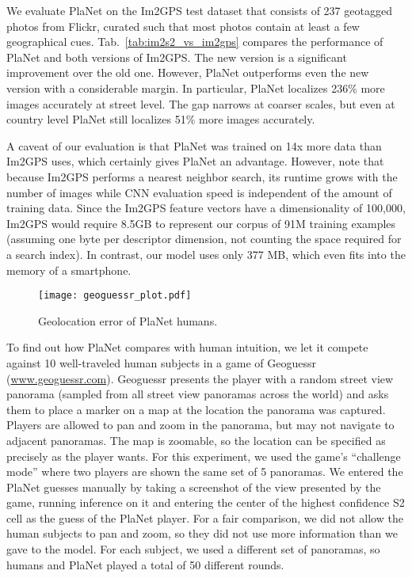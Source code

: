 \documentclass[10pt,twocolumn,letterpaper]{article}
\begin{document}
We evaluate PlaNet on the Im2GPS test dataset \cite{Hays08CVPR}
that consists of 237 geotagged photos from Flickr, curated such that
most photos contain at least a few geographical cues. 
Tab.~\ref{tab:im2s2_vs_im2gps} compares the performance of
PlaNet and both versions of Im2GPS. The new version is a
significant improvement over the old one. However, PlaNet
outperforms even the new version with a considerable margin. In
particular, PlaNet localizes 236\% more images accurately at
street level. The gap narrows at coarser scales, but even at country level
PlaNet still localizes 51\% more images accurately.

A caveat of our evaluation is that PlaNet was trained on 14x
more data than Im2GPS uses, which certainly gives PlaNet an
advantage. However, note that because Im2GPS performs a nearest
neighbor search, its runtime grows with the number of images while CNN
evaluation speed is independent of the amount of training data. Since
the Im2GPS feature vectors have a dimensionality of 100,000, Im2GPS
would require 8.5GB to represent our corpus of 91M training examples
(assuming one byte per descriptor dimension, not counting the space
required for a search index). In contrast, our model uses only 377 MB,
which even fits into the memory of a smartphone.

\begin{figure}
  \texttt{[image: geoguessr\_plot.pdf]}
  \caption{Geolocation error of PlaNet \vs humans.}
  \label{fig:geoguessr_plot}
\end{figure}
To find out how PlaNet compares with human intuition, we let it compete against 10
well-traveled human subjects in a game of Geoguessr
(\href{http://www.geoguessr.com}{www.geoguessr.com}). Geoguessr
presents the player with a random street view panorama (sampled from
all street view panoramas across the world) and asks them to place a
marker on a map at the location the panorama was captured. Players are
allowed to pan and zoom in the panorama, but may not navigate to
adjacent panoramas. The map is zoomable, so the location can be
specified as precisely as the player wants. For this experiment, we
used the game's ``challenge mode'' where two players are shown the
same set of 5 panoramas. We entered the PlaNet guesses manually
by taking a screenshot of the view presented by the game, running
inference on it and entering the center of the highest confidence S2
cell as the guess of the PlaNet player. For a fair comparison,
we did not allow the human subjects to pan and zoom, so they did not
use more information than we gave to the model. For each subject, we
used a different set of panoramas, so humans and PlaNet played a
total of 50 different rounds.
\end{document}
